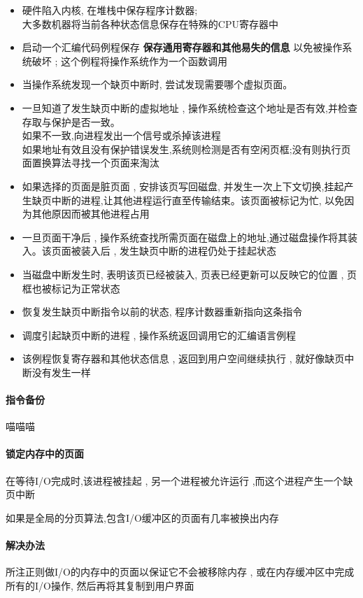 \documentclass[UTF8,a4paper]{ctexart}
\begin{document}
\begin{itemize}
	\item 硬件陷入内核, 在堆栈中保存程序计数器;\\
	大多数机器将当前各种状态信息保存在特殊的CPU寄存器中
	\item 启动一个汇编代码例程保存 \textbf{保存通用寄存器和其他易失的信息} 以免被操作系统破坏 ; 这个例程将操作系统作为一个函数调用
	\item 当操作系统发现一个缺页中断时, 尝试发现需要哪个虚拟页面。
	\item 一旦知道了发生缺页中断的虚拟地址 , 操作系统检查这个地址是否有效,并检查存取与保护是否一致。\\
	如果不一致,向进程发出一个信号或杀掉该进程\\
	如果地址有效且没有保护错误发生,系统则检测是否有空闲页框;没有则执行页面置换算法寻找一个页面来淘汰
	\item 如果选择的页面是脏页面 , 安排该页写回磁盘, 并发生一次上下文切换,挂起产生缺页中断的进程,让其他进程运行直至传输结束。该页面被标记为忙, 以免因为其他原因而被其他进程占用
	\item 一旦页面干净后 , 操作系统查找所需页面在磁盘上的地址,通过磁盘操作将其装入。该页面被装入后 , 发生缺页中断的进程仍处于挂起状态
	\item 当磁盘中断发生时, 表明该页已经被装入, 页表已经更新可以反映它的位置 , 页框也被标记为正常状态
	\item 恢复发生缺页中断指令以前的状态, 程序计数器重新指向这条指令
	\item 调度引起缺页中断的进程 , 操作系统返回调用它的汇编语言例程
	\item 该例程恢复寄存器和其他状态信息 , 返回到用户空间继续执行 , 就好像缺页中断没有发生一样
\end{itemize}

\paragraph{指令备份} 
喵喵喵


\paragraph{锁定内存中的页面} 
在等待I/O完成时,该进程被挂起 , 另一个进程被允许运行 ,而这个进程产生一个缺页中断

如果是全局的分页算法,包含I/O缓冲区的页面有几率被换出内存

\paragraph{解决办法}所注正则做I/O的内存中的页面以保证它不会被移除内存 , 或在内存缓冲区中完成所有的I/O操作, 然后再将其复制到用户界面
\end{document}
